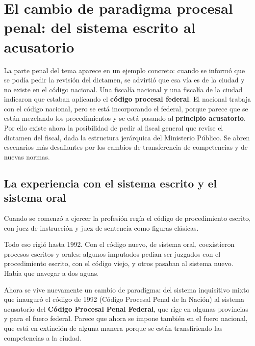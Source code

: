 \documentclass[12pt,oneside]{book}
\begin{document}
\section{El cambio de paradigma procesal penal: del sistema escrito al acusatorio}

La parte penal del tema aparece en un ejemplo concreto: cuando se informó que se podía pedir la revisión del dictamen, se advirtió que esa vía es de la ciudad y no existe en el código nacional. Una fiscalía nacional y una fiscalía de la ciudad indicaron que estaban aplicando el \textbf{código procesal federal}. El nacional trabaja con el código nacional, pero se está incorporando el federal, porque parece que se están mezclando los procedimientos y se está pasando al \textbf{principio acusatorio}. Por ello existe ahora la posibilidad de pedir al fiscal general que revise el dictamen del fiscal, dada la estructura jerárquica del Ministerio Público. Se abren escenarios más desafiantes por los cambios de transferencia de competencias y de nuevas normas.

\subsection{La experiencia con el sistema escrito y el sistema oral}

Cuando se comenzó a ejercer la profesión regía el código de procedimiento escrito, con juez de instrucción y juez de sentencia como figuras clásicas.

Todo eso rigió hasta 1992. Con el código nuevo, de sistema oral, coexistieron procesos escritos y orales: algunos imputados pedían ser juzgados con el procedimiento escrito, con el código viejo, y otros pasaban al sistema nuevo. Había que navegar a dos aguas.

Ahora se vive nuevamente un cambio de paradigma: del sistema inquisitivo mixto que inauguró el código de 1992 (Código Procesal Penal de la Nación) al sistema acusatorio del \textbf{Código Procesal Penal Federal}, que rige en algunas provincias y para el fuero federal. Parece que ahora se impone también en el fuero nacional, que está en extinción de alguna manera porque se están transfiriendo las competencias a la ciudad.
\end{document}
